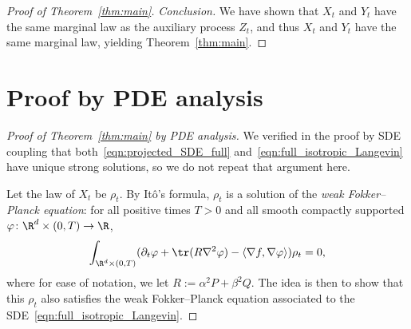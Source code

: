 \documentclass[twoside,a4paper,11pt]{article}
\renewcommand{\phi}{\varphi}
\theoremstyle{plain}
\begin{document}
\begin{proof}[Proof of Theorem~\ref{thm:main}]
    {\it Conclusion.} We have shown that $X_t$ and $Y_t$
    have the same marginal law as the auxiliary process $Z_t$,
    and thus $X_t$ and $Y_t$ have the same marginal law,
    yielding Theorem~\ref{thm:main}.
\end{proof}

\section{Proof by PDE analysis}
\label{appendix:proof_by_PDE}








\begin{proof}[Proof of Theorem~\ref{thm:main} by PDE analysis]
We verified in the proof by SDE coupling
that both~\eqref{eqn:projected_SDE_full}
and~\eqref{eqn:full_isotropic_Langevin}
have unique strong solutions,
so we do not repeat that argument here.

Let the law of $X_t$ be
$\rho_t$.
By Itô's formula,
$\rho_t$ is a solution of the {\it weak Fokker--Planck equation}:
for all positive times $T > 0$ and all smooth compactly supported $\phi \colon \R^d \times (0, T) \to \R$,
\begin{equation}\label{eqn:weak_fokker_planck}
\int_{\R^d\times (0, T)} (\partial_t \phi + 
\tr(R\nabla^2\phi) - \langle \nabla f, \nabla \phi \rangle) \rho_t = 0,
\end{equation} where for ease of notation, we let $R := \alpha^2 P + \beta^2 Q$.
The idea is then to show that this $\rho_t$ also
satisfies the weak Fokker--Planck equation associated
to the SDE~\eqref{eqn:full_isotropic_Langevin}.




\end{proof}
\end{document}
